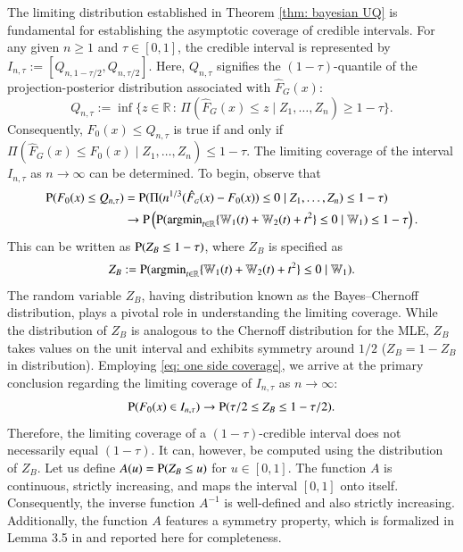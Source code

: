 The limiting distribution established in Theorem \ref{thm: bayesian UQ} is fundamental for establishing the asymptotic coverage of credible intervals. For any given $n \ge 1$ and $\tau \in [0, 1]$, the credible interval is represented by $I_{n,\tau} := [Q_{n,1-\tau/2}, Q_{n,\tau/2}]$. Here, $Q_{n,\tau}$ signifies the $(1-\tau)$-quantile of the projection-posterior distribution associated with $\hat{F}_{\scriptscriptstyle{G}}(x)$:
$$ Q_{n,\tau} := \inf \{ z \in \mathbb{R} \, : \, \Pi ( \hat{F}_{\scriptscriptstyle{G}}(x) \le z \mid Z_1, \ldots, Z_n ) \ge 1- \tau \}. $$
Consequently, $F_0(x) \le Q_{n,\tau}$ is true if and only if $\Pi ( \hat{F}_{\scriptscriptstyle{G}}(x) \le F_0(x) \mid Z_1, \ldots, Z_n ) \le 1- \tau$. The limiting coverage of the interval $I_{n,\tau}$ as $n \rightarrow \infty$ can be determined. To begin, observe that
\begin{align}\label{eq: one side coverage}
	\mathrm{P} (F_0(x) \le Q_{n,\tau}) &= \mathrm{P} (\Pi(n^{1/3}(\hat{F}_{\scriptscriptstyle{G}}(x) - F_0(x)) \le 0 \mid Z_1,\ldots,Z_n) \le 1-\tau) \\
	&\to \mathrm{P} \left( \mathrm{P} (\operatorname{argmin}_{t \in \mathbb{R}}\{ \mathbb{W}_1(t) + \mathbb{W}_2(t) + t^2\} \le 0 \mid \mathbb{W}_1) \le 1-\tau \right).
\end{align}
This can be written as $\mathrm{P} (Z_B \le 1-\tau)$, where $Z_B$ is specified as
\begin{align} \label{eq:ZB_def}
	Z_B := \mathrm{P} (\operatorname{argmin}_{t \in \mathbb{R}}\{ \mathbb{W}_1(t) + \mathbb{W}_2(t) + t^2 \} \le 0 \mid \mathbb{W}_1).
\end{align}
The random variable $Z_B$, having distribution known as the Bayes--Chernoff distribution, plays a pivotal role in understanding the limiting coverage. While the distribution of $Z_B$ is analogous to the Chernoff distribution for the MLE, $Z_B$ takes values on the unit interval and exhibits symmetry around $1/2$ ($Z_B = 1 - Z_B$ in distribution). Employing \eqref{eq: one side coverage}, we arrive at the primary conclusion regarding the limiting coverage of $I_{n,\tau}$ as $n \to \infty$:
$$\mathrm{P}(F_0(x) \in I_{n,\tau}) \to \mathrm{P} (\tau/2 \le Z_B \le 1-\tau/2).$$
Therefore, the limiting coverage of a $(1-\tau)$-credible interval does not necessarily equal $(1-\tau)$. It can, however, be computed using the distribution of $Z_B$. Let us define $A(u) = \mathrm{P}(Z_B \le u)$ for $u \in [0, 1]$. The function $A$ is continuous, strictly increasing, and maps the interval $[0, 1]$ onto itself. Consequently, the inverse function $A^{-1}$ is well-defined and also strictly increasing. Additionally, the function $A$ features a symmetry property, which is formalized in Lemma 3.5 in \cite{54} and reported here for completeness.
